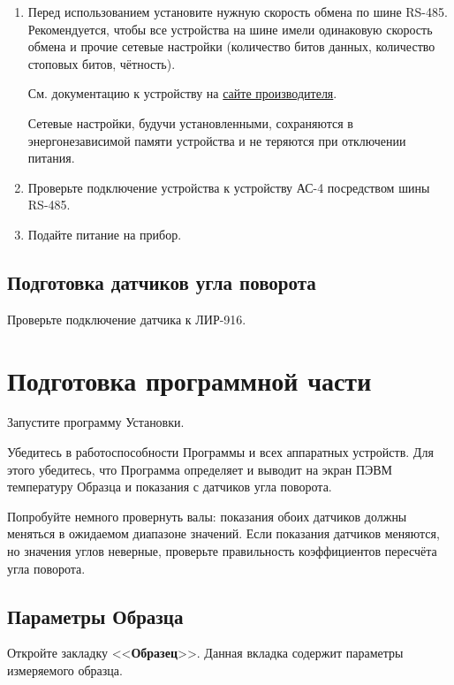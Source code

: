 \documentclass[12pt, a4paper, twocolumn]{book}
\newcommand{\CTL}[1]{<<{\bf #1}>>}
\begin{document}
\begin{enumerate}

\item Перед использованием установите нужную скорость обмена по шине RS-485. Рекомендуется, чтобы все устройства на шине имели одинаковую скорость обмена и прочие сетевые настройки (количество битов данных, количество стоповых битов, чётность).

См. документацию к устройству на \href{http://www.skbis.ru/index.php?p=3&c=8&d=56}{сайте производителя}.

Сетевые настройки, будучи установленными, сохраняются в энергонезависимой памяти устройства и не теряются при отключении питания.

\item Проверьте подключение устройства к устройству АС-4 посредством шины RS-485.

\item Подайте питание на прибор.

\end{enumerate}

\subsection{Подготовка датчиков угла поворота}

Проверьте подключение датчика к ЛИР-916.

\section{Подготовка программной части}

Запустите программу Установки.

Убедитесь в работоспособности Программы и всех аппаратных устройств. Для этого убедитесь, что Программа определяет и выводит на экран ПЭВМ температуру Образца и показания с датчиков угла поворота.

Попробуйте немного провернуть валы: показания обоих датчиков должны меняться в ожидаемом диапазоне значений. Если показания датчиков меняются, но значения углов неверные, проверьте правильность коэффициентов пересчёта угла поворота.

\subsection{Параметры Образца}

Откройте закладку \CTL{Образец}. Данная вкладка содержит параметры измеряемого образца.
\end{document}
